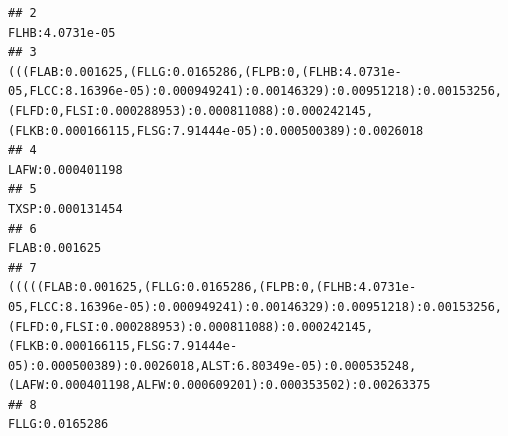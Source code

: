 \documentclass[]{article}
\begin{document}
\begin{verbatim}
## 2                                                                                                                                                                                                                                                                                                                                                                                                                             FLHB:4.0731e-05
## 3                                                                                                                                                                                                   (((FLAB:0.001625,(FLLG:0.0165286,(FLPB:0,(FLHB:4.0731e-05,FLCC:8.16396e-05):0.000949241):0.00146329):0.00951218):0.00153256,(FLFD:0,FLSI:0.000288953):0.000811088):0.000242145,(FLKB:0.000166115,FLSG:7.91444e-05):0.000500389):0.0026018
## 4                                                                                                                                                                                                                                                                                                                                                                                                                            LAFW:0.000401198
## 5                                                                                                                                                                                                                                                                                                                                                                                                                            TXSP:0.000131454
## 6                                                                                                                                                                                                                                                                                                                                                                                                                               FLAB:0.001625
## 7                                                                                                       (((((FLAB:0.001625,(FLLG:0.0165286,(FLPB:0,(FLHB:4.0731e-05,FLCC:8.16396e-05):0.000949241):0.00146329):0.00951218):0.00153256,(FLFD:0,FLSI:0.000288953):0.000811088):0.000242145,(FLKB:0.000166115,FLSG:7.91444e-05):0.000500389):0.0026018,ALST:6.80349e-05):0.000535248,(LAFW:0.000401198,ALFW:0.000609201):0.000353502):0.00263375
## 8                                                                                                                                                                                                                                                                                                                                                                                                                              FLLG:0.0165286

\end{verbatim}
\end{document}
